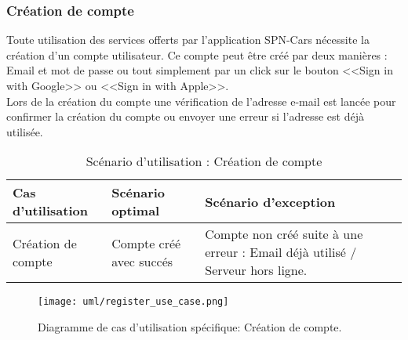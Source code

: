 \subsubsection{Création de compte}
Toute utilisation des services offerts par l'application SPN-Cars nécessite la création d'un compte utilisateur. Ce compte peut être créé par deux manières : Email et mot de passe ou tout simplement par un click sur le bouton <<Sign in with Google>> ou <<Sign in with Apple>>.\\
\noindent Lors de la création du compte une vérification de l'adresse e-mail est lancée pour confirmer la création du compte ou envoyer une erreur si l'adresse est déjà utilisée.
\begin{table}[H]
    \begin{center}
        \begin{tabularx}{\textwidth} {
                | >{\centering\arraybackslash}X
                | >{\centering\arraybackslash}X
                | >{\centering\arraybackslash}X |}
            \hline
            Cas d'utilisation  & Scénario optimal        & Scénario d'exception                                                          \\
            \hline
            Création de compte & Compte créé avec succés & Compte non créé suite à une erreur : Email déjà utilisé / Serveur hors ligne. \\
            \hline
        \end{tabularx}
        \captionsetup{justification=centering}
        \caption{Scénario d'utilisation : Création de compte}
        \label{tab:register_scenario}
    \end{center}
\end{table}
\vspace{1cm}
\begin{figure}[H]
    \centering
    \texttt{[image: uml/register\_use\_case.png]}
    \captionsetup{justification = centering}
    \caption{Diagramme de cas d'utilisation spécifique: Création de compte.}
    \label{fig:register_use_case}
\end{figure}
